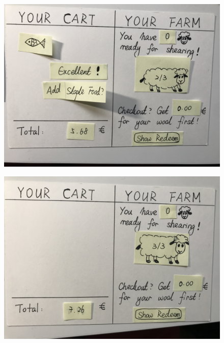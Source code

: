 \documentclass[a4paper,10pt,oneside]{scrreprt}
\begin{document}
\begin{figure}[h]
	\centering
	\includegraphics[scale=0.10, clip, trim={0em 0em 0em 0em}]{images/IMG_0577.jpg}
\end{figure}

\begin{figure}[h]
	\centering
	\includegraphics[scale=0.10, clip, trim={0em 0em 0em 0em}]{images/IMG_0578.jpg}
\end{figure}
\end{document}
